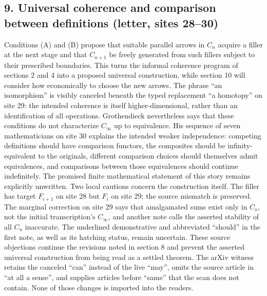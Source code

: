\subsection*{9. Universal coherence and comparison between definitions (letter, sites 28--30)}
Conditions (A) and (B) propose that suitable parallel arrows in $C_n$ acquire a filler at the next stage and that $C_{n+1}$ be freely generated from such fillers subject to their prescribed boundaries. This turns the informal coherence program of sections 2 and 4 into a proposed universal construction, while section 10 will consider how economically to choose the new arrows. The phrase ``an isomorphism'' is visibly canceled beneath the typed replacement ``a homotopy'' on site 29: the intended coherence is itself higher-dimensional, rather than an identification of all operations. Grothendieck nevertheless says that these conditions do not characterize $C_\infty$ up to equivalence. His sequence of seven mathematicians on site 30 explains the intended weaker independence: competing definitions should have comparison functors, the composites should be infinity-equivalent to the originals, different comparison choices should themselves admit equivalences, and comparisons between those equivalences should continue indefinitely. The promised finite mathematical statement of this story remains explicitly unwritten. Two local cautions concern the construction itself. The filler has target $F_{i+1}$ on site 28 but $F_i$ on site 29; the source mismatch is preserved. The marginal correction on site 29 says that amalgamated sums exist only in $C_o$, not the initial transcription's $C_\infty$, and another note calls the asserted stability of all $C_n$ inaccurate. The underlined demonstrative and abbreviated ``should'' in the first note, as well as its hatching status, remain uncertain. These source objections continue the revisions noted in section 8 and prevent the asserted universal construction from being read as a settled theorem. The arXiv witness retains the canceled ``can'' instead of the live ``may'', omits the source article in ``at all a sense'', and supplies articles before ``same'' that the scan does not contain. None of those changes is imported into the readers.

